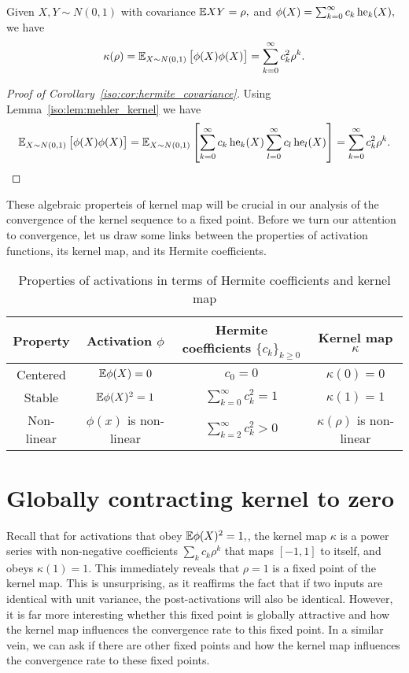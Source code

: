 \begin{corollary}
    \label{iso:cor:hermite_covariance}
    \label{iso:cor:kernel_map}
Given $X,Y \sim N(0,1)$ with covariance $\mathbb{E} X Y = \rho,$ and $\phi(X) = \sum_{k=0}^\infty c_k \,\mathrm{he}_k(X),$ we have
\begin{align*}
\kappa(\rho) = \mathbb{E}_{X\sim N(0,1)} \left[\phi(X)\phi(X)\right] = \sum_{k=0}^\infty c_k^2 \rho^k.
\end{align*}
\end{corollary}

\begin{proof}[Proof of Corollary~\ref{iso:cor:hermite_covariance}]
Using Lemma~\ref{iso:lem:mehler_kernel} we have
\begin{align*}
\mathbb{E}_{X\sim N(0,1)} \left[\phi(X)\phi(X)\right] = \mathbb{E}_{X\sim N(0,1)} \left[\sum_{k=0}^\infty c_k \,\mathrm{he}_k(X)\sum_{l=0}^\infty c_l \,\mathrm{he}_l(X)\right] = \sum_{k=0}^\infty c_k^2 \rho^k.
\end{align*}
\end{proof}

These algebraic properteis of kernel map will be crucial in our analysis of the convergence of the kernel sequence to a fixed point. Before we turn our attention to convergence, let us draw some links between the properties of activation functions, its kernel map, and its Hermite coefficients.

\begin{table}[ht]
    \centering
    \caption{Properties of activations in terms of Hermite coefficients and kernel map}
    \begin{tabular}{|c|c|c|c|}
    \hline
 Property & Activation $\phi$ & Hermite coefficients $\{c_k\}_{k\ge 0}$ & Kernel map $\kappa$ \\
    \hline
 Centered & $\mathbb{E} \phi(X)=0$ & $c_0 = 0$ & $\kappa(0) = 0$ \\
    \hline
 Stable & $\mathbb{E} \phi(X)^2 = 1$ & $\sum_{k=0}^\infty c_k^2 = 1$ & $\kappa(1) = 1$ \\
    \hline
 Non-linear & $\phi(x)$ is non-linear & $\sum_{k=2}^\infty c_k^2 > 0$ & $\kappa(\rho)$ is non-linear \\
    \hline
    \end{tabular}
\end{table}


\section{Globally contracting kernel to zero}

Recall that for activations that obey $\mathbb{E} \phi(X)^2 = 1,$, the kernel map  $\kappa$ is a power series with non-negative coefficients $\sum_k c_k \rho^k$ that maps $[-1,1]$ to itself, and obeys $\kappa(1)=1.$ This immediately reveals that $\rho=1$ is a fixed point of the kernel map. This is unsurprising, as it reaffirms the fact that if two inputs are identical with unit variance, the post-activations will also be identical. However, it is far more interesting whether this fixed point is globally attractive and how the kernel map influences the convergence rate to this fixed point. In a similar vein, we can ask if there are other fixed points and how the kernel map influences the convergence rate to these fixed points.

